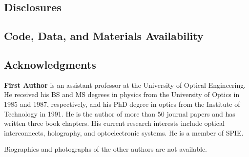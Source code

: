\documentclass[12pt]{spieman}  %
\begin{document}

\subsection*{Disclosures}


\subsection* {Code, Data, and Materials Availability} 


\subsection* {Acknowledgments}





\vspace{2ex}\noindent\textbf{First Author} is an assistant professor at the University of Optical Engineering. He received his BS and MS degrees in physics from the University of Optics in 1985 and 1987, respectively, and his PhD degree in optics from the Institute of Technology in 1991.  He is the author of more than 50 journal papers and has written three book chapters. His current research interests include optical interconnects, holography, and optoelectronic systems. He is a member of SPIE.

\vspace{1ex}
\noindent Biographies and photographs of the other authors are not available.

\listoffigures
\listoftables

\end{document}
